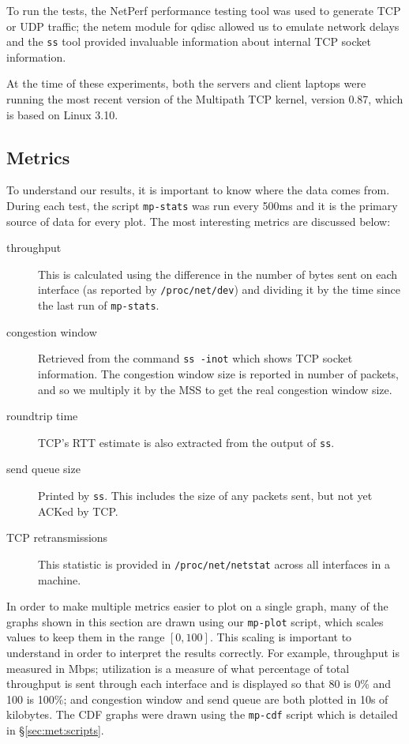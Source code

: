 To run the tests, the NetPerf performance testing tool was used to generate TCP
or UDP traffic; the netem module for qdisc allowed us to emulate network delays
and the \texttt{ss} tool provided invaluable information about internal TCP
socket information.

At the time of these experiments, both the servers and client laptops were
running the most recent version of the Multipath TCP kernel, version 0.87, which
is based on Linux 3.10.

\subsection{Metrics}
\label{sec:met:metrics}
To understand our results, it is important to know where the data comes from.
During each test, the script \texttt{mp-stats} was run every 500ms and it is the
primary source of data for every plot. The most interesting metrics are
discussed below:

\begin{description}
  \item[throughput]
    This is calculated using the difference in the number of bytes sent on each
    interface (as reported by \texttt{/proc\-/net/\-dev}) and dividing it by the
    time since the last run of \texttt{mp-stats}.
  \item[congestion window]
    Retrieved from the command \texttt{ss -inot} which shows TCP socket
    information. The congestion window size is reported in number of packets,
    and so we multiply it by the MSS to get the real congestion window size.
  \item[roundtrip time]
    TCP's RTT estimate is also extracted from the output of \texttt{ss}.
  \item[send queue size]
    Printed by \texttt{ss}. This includes the size of any packets sent, but not
    yet ACKed by TCP.
  \item[TCP retransmissions]
    This statistic is provided in \texttt{/proc\-/net/\-netstat} across all
    interfaces in a machine.
\end{description}

In order to make multiple metrics easier to plot on a single graph, many of the
graphs shown in this section are drawn using our \texttt{mp-plot} script, which
scales values to keep them in the range $[0,100]$. This scaling is important to
understand in order to interpret the results correctly. For example, throughput
is measured in Mbps; utilization is a measure of what percentage of total
throughput is sent through each interface and is displayed so that 80 is 0\% and
100 is 100\%; and congestion window and send queue are both plotted in 10s of
kilobytes. The CDF graphs were drawn using the \texttt{mp-cdf} script which is
detailed in \S\ref{sec:met:scripts}.

